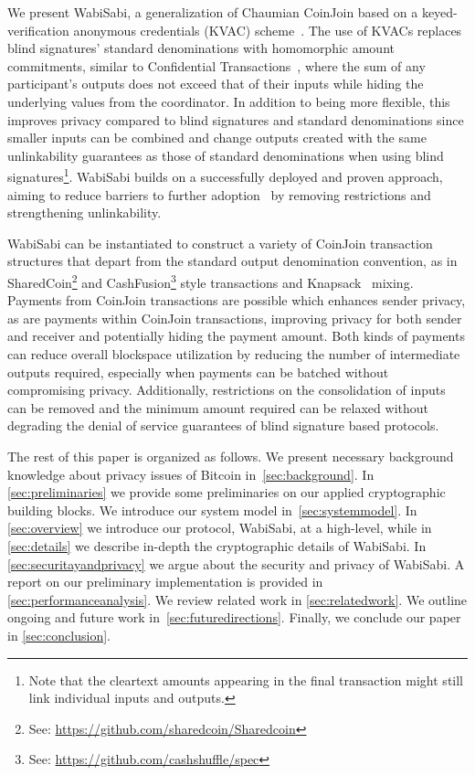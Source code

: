 \documentclass[a4paper]{article}
\begin{document}
We present WabiSabi, a generalization of Chaumian CoinJoin based on a keyed-verification anonymous credentials (KVAC) scheme~\cite{chase2019signal}. The use of KVACs replaces blind signatures' standard denominations with homomorphic amount commitments, similar to Confidential Transactions~\cite{maxwell2016confidential}, where the sum of any participant's outputs does not exceed that of their inputs while hiding the underlying values from the coordinator. In addition to being more flexible, this improves privacy compared to blind signatures and standard denominations since smaller inputs can be combined and change outputs created with the same unlinkability guarantees as those of standard denominations when using blind signatures\footnote{Note that the cleartext amounts appearing in the final transaction might still link individual inputs and outputs.}. WabiSabi builds on a successfully deployed and proven approach, aiming to reduce barriers to further adoption~\cite{dingledine2006anonymity} by removing restrictions and strengthening unlinkability.

WabiSabi can be instantiated to construct a variety of CoinJoin transaction structures that depart from the standard output denomination convention, as in SharedCoin\footnote{See: \url{https://github.com/sharedcoin/Sharedcoin}} and CashFusion\footnote{See: \url{https://github.com/cashshuffle/spec}} style transactions and Knapsack~\cite{maurer2017anonymous} mixing. Payments from CoinJoin transactions are possible which enhances sender privacy, as are payments within CoinJoin transactions, improving privacy for both sender and receiver and potentially hiding the payment amount. Both kinds of payments can reduce overall blockspace utilization by reducing the number of intermediate outputs required, especially when payments can be batched without compromising privacy. Additionally, restrictions on the consolidation of inputs can be removed and the minimum amount required can be relaxed without degrading the denial of service guarantees of blind signature based protocols.

The rest of this paper is organized as follows. We present necessary background knowledge about privacy issues of Bitcoin in~\cref{sec:background}. In \cref{sec:preliminaries} we provide some preliminaries on our applied cryptographic building blocks. We introduce our system model in~\cref{sec:systemmodel}. In \cref{sec:overview} we introduce our protocol, WabiSabi, at a high-level, while in \cref{sec:details} we describe in-depth the cryptographic details of WabiSabi. In \cref{sec:securitayandprivacy} we argue about the security and privacy of WabiSabi. A report on our preliminary implementation is provided in \cref{sec:performanceanalysis}. We review related work in \cref{sec:relatedwork}. We outline ongoing and future work in~\cref{sec:futuredirections}. Finally, we conclude our paper in \cref{sec:conclusion}.
\end{document}
